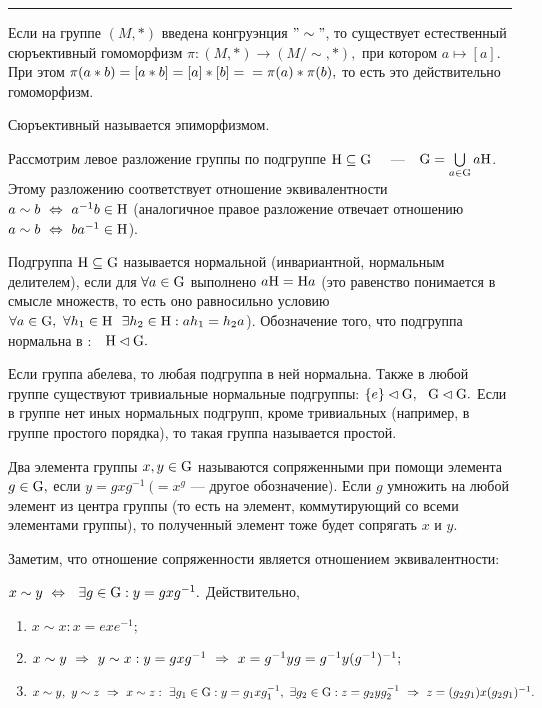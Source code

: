 \smallskip
\hrule
\rule{0pt}{20pt}

Если на группе $(M, *)$ введена конгруэнция $"\sim"$, то существует естественный сюръективный
гомоморфизм $\pi : (M,*)\rightarrow (M/\sim, *),$
при котором $a\mapsto [a].$ При этом $\pi(a*b)=[a*b]=[a]*[b]=\\=\pi(a)*\pi(b),$ то есть это действительно гомоморфизм.
\par\de Сюръективный \gmm называется эпиморфизмом.
\par Рассмотрим левое разложение группы  по подгруппе ${\rm H}\subseteq{\rm G}$ \ \ ---\ \ ${\rm G}=\bigcup\limits_{a\in{\rm G}}a{\rm H}$. Этому
разложению соответствует отношение эквивалентности $a\sim b\ \Leftrightarrow\  a^{-1}b\in {\rm H}$ (аналогичное правое разложение отвечает отношению $a\sim b\ \Leftrightarrow\  ba^{-1}\in{\rm H}$).
\par\de Подгруппа ${\rm H\subseteq G}$ называется нормальной (инвариантной, нормальным делителем), если для $\forall a\in{\rm G}$ выполнено $a{\rm H}={\rm H}a$ (это равенство понимается в смысле множеств, то есть оно
равносильно условию $\forall a\in\rr{G},\  \forall h_1\in\rr{H}\ \ \exists h_2\in\rr{H} : ah_1=h_2a$). Обозначение того, что подгруппа  нормальна в :\ \ ${\rm H}\lhd{\rm G}.$
\par Если группа абелева, то любая подгруппа в ней нормальна. Также в любой группе существуют тривиальные нормальные подгруппы: $\{e\}\lhd{\rm G},\ \ {\rm G}\lhd{\rm G}.$
Если в группе нет иных нормальных подгрупп, кроме тривиальных (например, в группе простого порядка), то такая группа называется простой.
\par\de Два элемента группы $x,y\in{\rm G}$ называются сопряженными при помощи элемента $g\in{\rm G},$ если $y=gxg^{-1}\ (=x^g$ --- другое обозначение).
Если $g$ умножить на любой элемент из центра группы (то есть на элемент, коммутирующий со всеми элементами группы), то полученный элемент тоже будет сопрягать $x$ и $y$.
\par Заметим, что отношение сопряженности является отношением эквивалентности:
\par $x\sim y \ \Leftrightarrow\  \ \exists g\in{\rm G} : y=gxg^{-1}.$ Действительно,
\begin{enumerate}
    \item $x\sim x : x=exe^{-1};$
    \item $x\sim y\ \Rightarrow\  y\sim x : y=gxg^{-1}\ \Rightarrow\  x=g^{-1}yg=g^{-1}y(g^{-1})^{-1};$
    \item $x\sim y,\ y\sim z\ra x\sim z : \ \exists g_1\in \rr{G} : y=g_1xg_1^{-1},\ \exists g_2\in\rr{G} : z=g_2yg_2^{-1}\ra z=(g_2g_1)x(g_2g_1)^{-1}.$
\end{enumerate}

